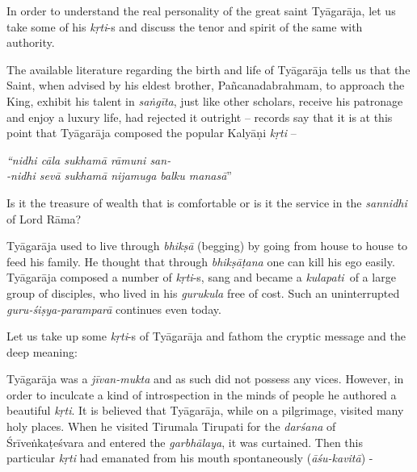 In order to understand the real personality of the great saint Tyāgarāja, let us take some of his \textit{kṛti}-s and discuss the tenor and spirit of the same with authority.

The available literature regarding the birth and life of Tyāgarāja tells us that the Saint, when advised by his eldest brother, Pañcanadabrahmam, to approach the King, exhibit his talent in \textit{saṅgīta}, just like other scholars, receive his patronage and enjoy a luxury life, had rejected it outright – records say that it is at this point that Tyāgarāja composed the popular Kalyāṇi \textit{kṛti} –

\begin{myquote}
\textit{“nidhi cāla sukhamā rāmuni san-}\\\textit{-nidhi sevā sukhamā nijamuga balku manasā}”
\end{myquote}

Is it the treasure of wealth that is comfortable or is it the service in the \textit{sannidhi} of Lord Rāma?

Tyāgarāja used to live through \textit{bhikṣā} (begging) by going from house to house to feed his family. He thought that through \textit{bhikṣāṭana} one can kill his ego easily. Tyāgarāja composed a number of \textit{kṛti}-s, sang and became a \textit{kulapati} of a large group of disciples, who lived in his \textit{gurukula} free of cost. Such an uninterrupted \textit{guru-śiṣya-paramparā} continues even today. 

Let us take up some \textit{kṛti}-s of Tyāgarāja and fathom the cryptic message and the deep meaning: 

Tyāgarāja was a \textit{jīvan-mukta} and as such did not possess any vices. However, in order to inculcate a kind of introspection in the minds of people he authored a beautiful \textit{kṛti}. It is believed that Tyāgarāja, while on a pilgrimage, visited many holy places. When he visited Tirumala Tirupati for the \textit{darśana} of Śrīveṅkaṭeśvara and entered the \textit{garbhālaya}, it was curtained. Then this particular \textit{kṛti} had emanated from his mouth spontaneously (\textit{āśu-kavitā}) -


